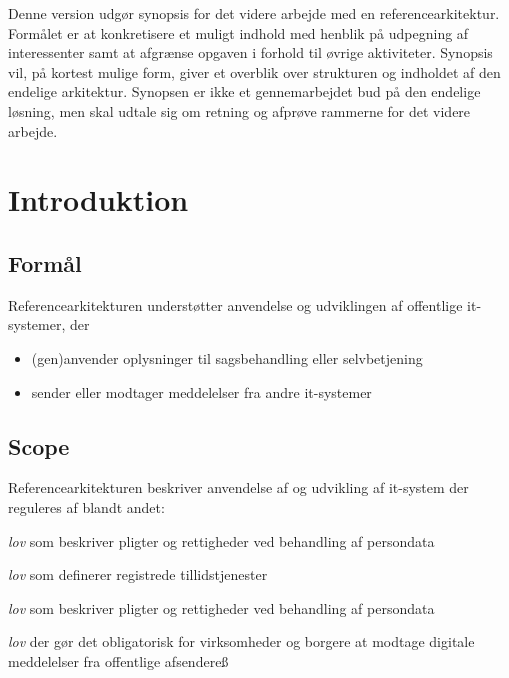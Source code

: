 Denne version udgør synopsis for det videre arbejde med en
referencearkitektur. Formålet er at konkretisere et muligt indhold med
henblik på udpegning af interessenter samt at afgrænse opgaven i forhold
til øvrige aktiviteter. Synopsis vil, på kortest mulige form, giver et
overblik over strukturen og indholdet af den endelige arkitektur.
Synopsen er ikke et gennemarbejdet bud på den endelige løsning, men skal
udtale sig om retning og afprøve rammerne for det videre arbejde.

\section{Introduktion}\label{introduktion}

\subsection{Formål}\label{formuxe5l}

Referencearkitekturen understøtter anvendelse og udviklingen af
offentlige it-systemer, der

\begin{itemize}
\tightlist
\item
  (gen)anvender oplysninger til sagsbehandling eller selvbetjening
\item
  sender eller modtager meddelelser fra andre it-systemer
\end{itemize}

\subsection{Scope}\label{scope}

Referencearkitekturen beskriver anvendelse af og udvikling af it-system
der reguleres af blandt andet:

\begin{description}
\tightlist
\item[EU databeskyttelse]
\emph{lov} som beskriver pligter og rettigheder ved behandling af
persondata
\item[EU eIDAS]
\emph{lov} som definerer registrede tillidstjenester
\item[Persondata lov]
\emph{lov} som beskriver pligter og rettigheder ved behandling af
persondata
\item[Lov om Digital Post]
\emph{lov} der gør det obligatorisk for virksomheder og borgere at
modtage digitale meddelelser fra offentlige afsendereß
\end{description}

